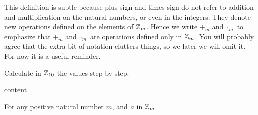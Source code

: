This definition is subtle because plus sign and times sign do not refer to addition and multiplication on the natural numbers, or even in the integers. They denote new operations defined on the elements of ${\mathbb Z}_m$. Hence we write $+_m$ and $\cdot_m$ to emphasize that $+_m$ and $\cdot_m$ are operations defined only in ${\mathbb Z}_m$. You will probably agree that the extra bit of notation clutters things, so we later we will omit it. For now it is a useful reminder.

\begin{exer}
	\begin{exercise}
		\item Calculate in $\ZZ_{10}$ the values step-by-step.
		\begin{enumerate}
			\item $T_4 + 4$
			\item $T_8+3$
			\item $T_2\times 
		\end{enumerate}
	\end{exercise}
	content
\end{exer}



\begin{lem}
	For any positive natural number $m$, and $a$ in ${\mathbb Z}_m$ 
\end{lem}
